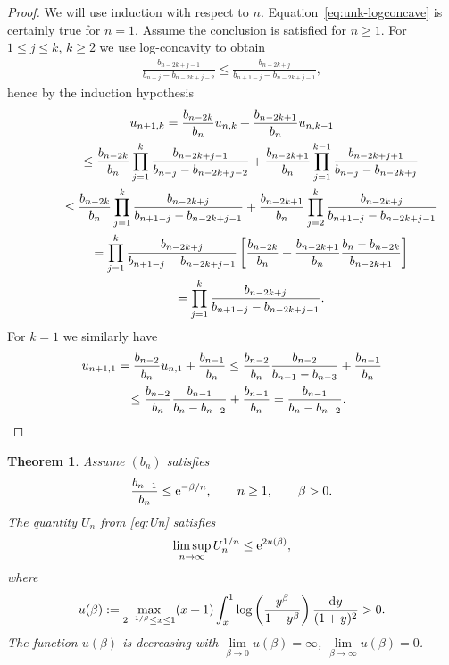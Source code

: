 \documentclass[pdftex]{sigma}
\numberwithin{equation}{section}
\newtheorem{thm}{Theorem}[section]
\begin{document}
\begin{proof}We will use induction with respect to $n$. Equation~\eqref{eq:unk-logconcave} is certainly true for $n=1$. Assume the conclusion is satisfied for $n\ge 1$. For $1\le j\le k$, $k\ge 2$ we use log-concavity to obtain
\begin{gather*}
\frac{b_{n-2k+j-1}}{b_{n-j}-b_{n-2k+j-2}}\le \frac{b_{n-2k+j}}{b_{n+1-j}-b_{n-2k+j-1}},
\end{gather*}
hence by the induction hypothesis
\begin{gather*}
u_{n+1,k} = {b_{n-2k}\over b_n}u_{n,k}+ {b_{n-2k+1}\over b_n}u_{n,k-1}\\
\hphantom{u_{n+1,k}}{} \le {b_{n-2k}\over b_n}\prod_{j=1}^k {b_{n-2k+j-1}\over b_{n-j}-b_{n-2k+j-2}}+
{b_{n-2k+1}\over b_n}\prod_{j=1}^{k-1} {b_{n-2k+j+1}\over b_{n-j}-b_{n-2k+j}}\\
\hphantom{u_{n+1,k}}{} \le {b_{n-2k}\over b_n}\prod_{j=1}^k {b_{n-2k+j}\over b_{n+1-j}-b_{n-2k+j-1}}+
{b_{n-2k+1}\over b_n}\prod_{j=2}^{k} {b_{n-2k+j}\over b_{n+1-j}-b_{n-2k+j-1}} \\
\hphantom{u_{n+1,k}}{} = \prod_{j=1}^k {b_{n-2k+j}\over b_{n+1-j}-b_{n-2k+j-1}}\left [{b_{n-2k}\over b_n}+{b_{n-2k+1}\over b_n}{b_n-b_{n-2k}\over b_{n-2k+1}}\right ]\\
\hphantom{u_{n+1,k}}{} = \prod_{j=1}^k {b_{n-2k+j}\over b_{n+1-j}-b_{n-2k+j-1}}.
\end{gather*}
For $k=1$ we similarly have
\begin{gather*}
u_{n+1,1} = {b_{n-2}\over b_n}u_{n,1}+{b_{n-1}\over b_n}\le {b_{n-2}\over b_n}{b_{n-2}\over b_{n-1}-b_{n-3}}+{b_{n-1}\over b_n}\\
\hphantom{u_{n+1,1}}{} \le {b_{n-2}\over b_n}{b_{n-1}\over b_{n}-b_{n-2}}+{b_{n-1}\over b_n}={b_{n-1}\over b_{n}-b_{n-2}}.\tag*{\qed}
\end{gather*}\renewcommand{\qed}{}
\end{proof}

\begin{thm}\label{thm:thm2}Assume $(b_n)$ satisfies
\begin{gather}\label{eq:b_{n-1}/b_n}
{b_{n-1}\over b_{n}}\le {\rm e}^{-\beta/n}, \qquad n\ge 1,\qquad \beta>0.
\end{gather}
The quantity $U_n$ from \eqref{eq:Un} satisfies
\begin{gather}\label{eq:rootUn}
\limsup_{n\to\infty} U_n^{1/n}\le {\rm e}^{2u(\beta)},
\end{gather}
where
\begin{eqnarray}\label{eq:mbeta}
u(\beta):=\max_{2^{-1/\beta}\le x\le 1} (x+1) \int_x^1 \log\left(\frac{y^\beta}{1-y^\beta}\right)\frac{{\rm d}y}{(1+y)^2}>0.
\end{eqnarray}
The function $u(\beta)$ is decreasing with $\lim\limits_{\beta\to 0}u(\beta)=\infty$, $\lim\limits_{\beta\to\infty}u(\beta)=0$.
\end{thm}
\end{document}
